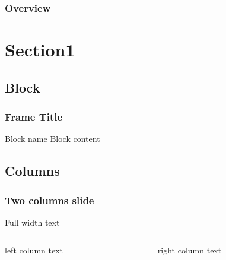 \documentclass[
    11pt, %
]{beamer}
\begin{document}
\begin{frame}
	\titlepage
\end{frame}

\begin{frame}
	\frametitle{Overview}
	\tableofcontents
\end{frame}

\section{Section1}
\frame{\tableofcontents[currentsection]}

\subsection{Block}

\begin{frame}
    \frametitle{Frame Title}

    \begin{block}{Block name}
        Block content
    \end{block}

\end{frame}
\subsection{Columns}
\begin{frame}
    \frametitle{Two columns slide}
    Full width text
    \begin{columns}[c]
		\begin{column}{0.5\linewidth}
			left column text
		\end{column}
        \begin{column}{0.5\linewidth}
            right column text
        \end{column}
    \end{columns}
\end{frame}
\end{document}
